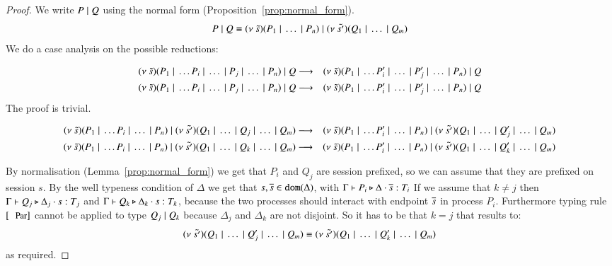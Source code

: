 \begin{proof}
	We write $P \;|\; Q$ using the normal form (Proposition~\ref{prop:normal_form}).
	\[
		P \;|\; Q \equiv (\nu\ \tilde{s})(P_1 \;|\; \dots \;|\; P_n) \;|\; (\nu\ \tilde{s'})(Q_1 \;|\; \dots \;|\; Q_m) 
	\]
	We do a case analysis on the possible reductions:

	\Case{}
%
	\begin{eqnarray*}
		(\nu\ \tilde{s})(P_1 \;|\; \dots P_i \;|\; \dots \;|\; P_j \;|\; \dots \;|\; P_n) \;|\; Q
		&\longrightarrow&
		(\nu\ \tilde{s})(P_1 \;|\; \dots P_i' \;|\; \dots \;|\; P_j' \;|\; \dots \;|\; P_n) \;|\; Q\\
		(\nu\ \tilde{s})(P_1 \;|\; \dots P_i \;|\; \dots \;|\; P_j \;|\; \dots \;|\; P_n) \;|\; Q
		&\longrightarrow&
		(\nu\ \tilde{s})(P_1 \;|\; \dots P_i' \;|\; \dots \;|\; P_j' \;|\; \dots \;|\; P_n) \;|\; Q
	\end{eqnarray*}
	The proof is trivial.

	\Case{}
%
	\begin{eqnarray*}
		(\nu\ \tilde{s})(P_1 \;|\; \dots P_i \;|\; \dots \;|\; P_n) \;|\; (\nu\ \tilde{s'})(Q_1 \;|\; \dots \;|\; Q_j \;|\; \dots \;|\; Q_m) 
		&\longrightarrow&
		(\nu\ \tilde{s})(P_1 \;|\; \dots P_i' \;|\; \dots \;|\; P_n) \;|\; (\nu\ \tilde{s'})(Q_1 \;|\; \dots \;|\; Q_j' \;|\; \dots \;|\; Q_m) \\
		(\nu\ \tilde{s})(P_1 \;|\; \dots P_i \;|\; \dots \;|\; P_n) \;|\; (\nu\ \tilde{s'})(Q_1 \;|\; \dots \;|\; Q_k \;|\; \dots \;|\; Q_m) 
		&\longrightarrow&
		(\nu\ \tilde{s})(P_1 \;|\; \dots P_i' \;|\; \dots \;|\; P_n) \;|\; (\nu\ \tilde{s'})(Q_1 \;|\; \dots \;|\; Q_k' \;|\; \dots \;|\; Q_m) \\
	\end{eqnarray*}

	By normalisation (Lemma~\ref{prop:normal_form}) we get that $P_i$ and $Q_j$ are session prefixed, so we can assume that
	they are prefixed on session $s$. By the well typeness condition of $\Delta$ we get that $s, \overline{s} \in \mathtt{dom}(\Delta)$,
	with $\Gamma \vdash P_i \triangleright \Delta \cdot \overline{s}: T_i$
	If we assume that $k \not= j$ then $\Gamma \vdash Q_j \triangleright \Delta_j \cdot s: T_j$ and $\Gamma \vdash Q_k \triangleright \Delta_k \cdot s: T_k$,
	because the two processes should interact with endpoint $\overline{s}$ in process $P_i$.
	Furthermore typing rule $\trule{Par}$ cannot be applied to type $Q_j \;|\; Q_k$ because $\Delta_j$ and $\Delta_k$ are not disjoint.
	So it has to be that $k = j$ that results to:
	\[
		(\nu\ \tilde{s'})(Q_1 \;|\; \dots \;|\; Q_j' \;|\; \dots \;|\; Q_m) \equiv (\nu\ \tilde{s'})(Q_1 \;|\; \dots \;|\; Q_k' \;|\; \dots \;|\; Q_m)
	\]
	as required.
\end{proof}

